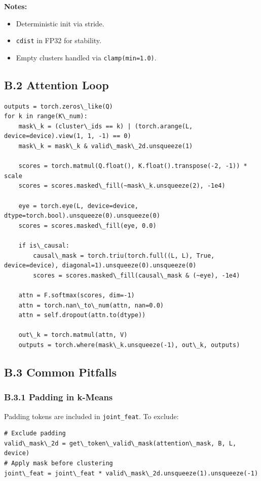 \textbf{Notes:}
\begin{itemize}
\item Deterministic init via stride.
\item \texttt{cdist} in FP32 for stability.
\item Empty clusters handled via \texttt{clamp(min=1.0)}.

\end{itemize}
\subsection{B.2 Attention Loop}

\begin{lstlisting}
outputs = torch.zeros\_like(Q)
for k in range(K\_num):
    mask\_k = (cluster\_ids == k) | (torch.arange(L, device=device).view(1, 1, -1) == 0)
    mask\_k = mask\_k & valid\_mask\_2d.unsqueeze(1)

    scores = torch.matmul(Q.float(), K.float().transpose(-2, -1)) * scale
    scores = scores.masked\_fill(~mask\_k.unsqueeze(2), -1e4)

    eye = torch.eye(L, device=device, dtype=torch.bool).unsqueeze(0).unsqueeze(0)
    scores = scores.masked\_fill(eye, 0.0)

    if is\_causal:
        causal\_mask = torch.triu(torch.full((L, L), True, device=device), diagonal=1).unsqueeze(0).unsqueeze(0)
        scores = scores.masked\_fill(causal\_mask & (~eye), -1e4)

    attn = F.softmax(scores, dim=-1)
    attn = torch.nan\_to\_num(attn, nan=0.0)
    attn = self.dropout(attn.to(dtype))

    out\_k = torch.matmul(attn, V)
    outputs = torch.where(mask\_k.unsqueeze(-1), out\_k, outputs)
\end{lstlisting}

\subsection{B.3 Common Pitfalls}

\subsubsection{B.3.1 Padding in k-Means}

Padding tokens are included in \texttt{joint\_feat}. To exclude:

\begin{lstlisting}
# Exclude padding
valid\_mask\_2d = get\_token\_valid\_mask(attention\_mask, B, L, device)
# Apply mask before clustering
joint\_feat = joint\_feat * valid\_mask\_2d.unsqueeze(1).unsqueeze(-1)
\end{lstlisting}

